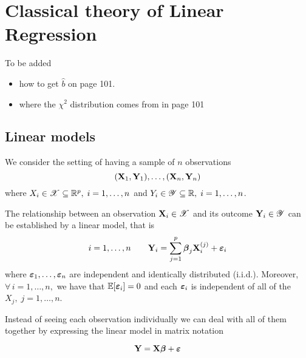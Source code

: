 \chapter{Classical theory of Linear Regression}

To be added
\begin{itemize}
    \item how to get $\hat b$ on page 101.
    \item where the $\chi^2$ distribution comes from in page 101
\end{itemize}

\section{Linear models}

We consider the setting of having a sample of $n$ observations
\[
    (\mathbf{X}_1, \mathbf{Y}_1), \ldots ,(\mathbf{X}_n, \mathbf{Y}_n)
\]
where $X_i \in \mathscr{X} \subseteq \mathbb{R}^p, \; i = 1, \ldots, n$ and $Y_i \in \mathscr{Y} \subseteq \mathbb{R}, \; i = 1, \ldots, n$.

\begin{definition}
    The relationship between an observation $\mathbf{X}_i \in \mathscr{X}$ and its outcome $\mathbf{Y}_i \in \mathscr{Y}$ can be established by a linear model, that is
    \begin{equation}
        i = 1, \ldots, n \qquad \mathbf{Y}_{i} = \sum_{j=1}^{p} \boldsymbol{\beta}_{j} \mathbf{X}_{i}^{(j)} + \boldsymbol{\varepsilon}_{i}
    \end{equation}
    where \(\boldsymbol{\varepsilon}_1, \ldots, \boldsymbol{\varepsilon}_n\) are independent and identically distributed (i.i.d.). Moreover, \(\forall \, i = 1, \ldots, n, \) we have that \( \mathbb{E} [\boldsymbol{\varepsilon}_i] = 0\) and each \(\boldsymbol{\varepsilon}_i\) is independent of all of the \( X_j, \; j=1, \ldots, n \).
\end{definition}

Instead of seeing each observation individually we can deal with all of them together by expressing the linear model in matrix notation

\begin{equation}
    \label{eqn: linear model (matrix)}
    \mathbf{Y} = \mathbf{X} \boldsymbol{\beta} + \boldsymbol{\varepsilon}
\end{equation}

